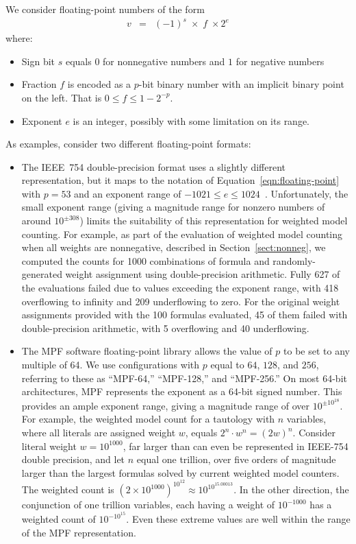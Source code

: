 \documentclass[
hf
]{ceurart}
\begin{document}
We consider floating-point numbers of the form
\begin{eqnarray}
v & = & (-1)^s \; \times \; f \; \times 2^{e} \label{eqn:floating-point}
\end{eqnarray}
where:
\begin{itemize}
\item Sign bit $s$ equals $0$ for nonnegative numbers and $1$ for negative numbers
\item Fraction $f$ is encoded as a $p$-bit binary number with an implicit binary point on the left.  That is $0 \leq f \leq 1-2^{-p}$.
\item Exponent $e$ is an integer, possibly with some limitation on its range.
\end{itemize}
As examples, consider two different floating-point formats:
\begin{itemize}
\item The IEEE~754 double-precision format uses a slightly different
  representation, but it maps to the notation of
  Equation~\ref{eqn:floating-point} with $p=53$ and an exponent range
  of $-1021 \leq e \leq 1024$~\cite{overton:siam:2001}.
  Unfortunately, the small exponent range (giving a magnitude range
  for nonzero numbers of around $10^{\pm 308}$) limits the suitability
  of this representation for weighted model counting.  For example, as
  part of the evaluation of weighted model counting when all weights
  are nonnegative, described in Section~\ref{sect:nonneg}, we computed
  the counts for 1000 combinations of formula and randomly-generated weight assignment
  using double-precision arithmetic.  Fully 627 of the evaluations
  failed due to values exceeding the exponent range, with 418
  overflowing to infinity and 209 underflowing to zero.  For the
  original weight assignments provided with the 100 formulas evaluated,
  45 of them failed with double-precision arithmetic, with 5
  overflowing and 40 underflowing.
\item The MPF software floating-point library allows the value of $p$
  to be set to any multiple of 64.  We use configurations with $p$ equal to $64$, $128$, and $256$,
  referring to these as ``MPF-64,'' ``MPF-128,'' and ``MPF-256.'' On
  most 64-bit architectures, MPF represents the exponent as a 64-bit
  signed number.  This provides an ample exponent range, giving a
  magnitude range of over $10^{\pm 10^{18}}$.
  For example, the weighted model count for a tautology with $n$ variables,
  where all literals are assigned weight $w$, equals
  $2^n\cdot w^n = (2w)^n$.  Consider literal weight $w=10^{1000}$,
 far larger than can even be represented in IEEE-754 double precision, and let $n$ equal one trillion, over five orders of magnitude
 larger than the largest formulas solved by current weighted model counters.  The weighted count is
 $(2 \times 10^{1000})^{10^{12}} \approx 10^{10^{15.00013}}$.  In the other direction, the conjunction of one trillion variables, each having a weight
 of $10^{-1000}$ has a weighted count of $10^{-10^{15}}$.  Even these extreme values are
 well within the range of the MPF representation.
\end{itemize}
\end{document}
